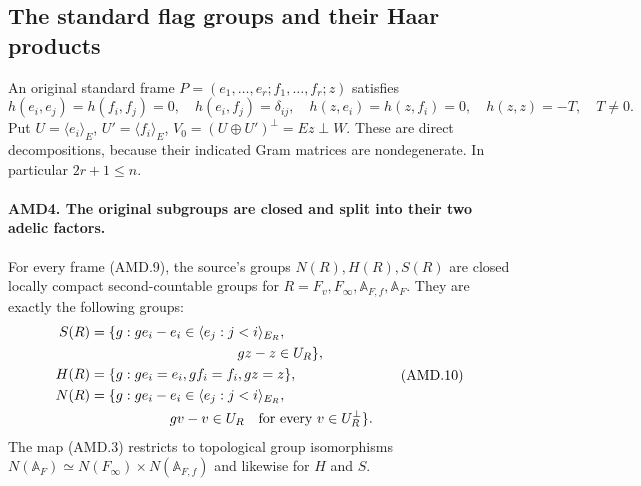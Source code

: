 \documentclass[11pt,a4paper]{article}
\numberwithin{equation}{section}
\theoremstyle{remark}\newtheorem{remark}[theorem]{Remark}
\begin{document}
\subsection{The standard flag groups and their Haar products}

An original standard frame \(P=(e_1,\ldots,e_r;
f_1,\ldots,f_r;z)\) satisfies
\[
 h(e_i,e_j)=h(f_i,f_j)=0,\quad h(e_i,f_j)=\delta_{ij},
 \quad h(z,e_i)=h(z,f_i)=0,\quad h(z,z)=-T,\quad T\ne0.
 \tag{AMD.9}
\]
Put \(U=\langle e_i\rangle_E\), \(U'=\langle f_i\rangle_E\),
\(V_0=(U\oplus U')^\perp=Ez\perp W\).  These are direct
decompositions, because their indicated Gram matrices are
nondegenerate.  In particular \(2r+1\le n\).

\paragraph{AMD4. The original subgroups are closed and split into their two adelic factors.}
\label{claim:AMD4}
For every frame (AMD.9), the source's groups \(N(R),H(R),S(R)\)
are closed locally compact second-countable groups for
\(R=F_v,F_\infty,\mathbb A_{F,f},\mathbb A_F\).  They are
exactly the following groups:
\[
\begin{split}
 S(R)&=\{g:ge_i-e_i\in\langle e_j:j<i\rangle_{E_R},\\
       &\hspace{37mm}gz-z\in U_R\},\\
 H(R)&=\{g:ge_i=e_i, gf_i=f_i, gz=z\},\\
 N(R)&=\{g:ge_i-e_i\in\langle e_j:j<i\rangle_{E_R},\\
       &\hspace{20mm}gv-v\in U_R\quad\hbox{for every }v\in U_R^\perp\}.
\end{split}
 \tag{AMD.10}
\]
The map (AMD.3) restricts to topological group isomorphisms
\(N(\mathbb A_F)\simeq N(F_\infty)\times N(\mathbb A_{F,f})\)
and likewise for \(H\) and \(S\).
\end{document}
